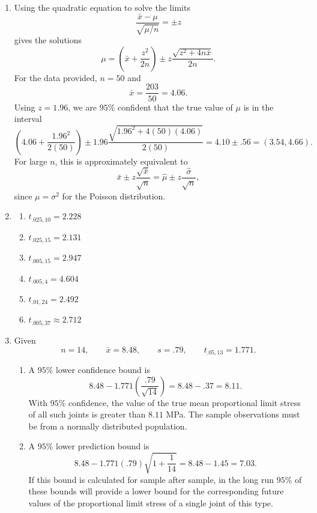 \documentclass[12pt]{article}
\begin{document}
\begin{enumerate}[label=\textbf{\arabic*.}, leftmargin=*]
\begin{enumerate}[label=\alph*.]
    \item
    \[
    n=\left[\frac{2z_{\alpha/2}\sqrt{\hat{p}\hat{q}}}{w}\right]^2
    =\left[\frac{2(2.58)(.5)(.5)}{.05}\right]^2=665.64,
    \]
    so $n$ must be at least $666$.
\end{enumerate}

\setcounter{enumi}{25}
\item
Using the quadratic equation to solve the limits
\[
\frac{\bar{x}-\mu}{\sqrt{\mu/n}}=\pm z
\]
gives the solutions
\[
\mu=\left(\bar{x}+\frac{z^2}{2n}\right)\pm z\frac{\sqrt{z^2+4n\bar{x}}}{2n}.
\]
For the data provided, $n=50$ and
\[
\bar{x}=\frac{203}{50}=4.06.
\]
Using $z=1.96$, we are $95\%$ confident that the true value of $\mu$ is in the interval
\[
\left(4.06+\frac{1.96^2}{2(50)}\right)
\pm1.96\frac{\sqrt{1.96^2+4(50)(4.06)}}{2(50)}
=4.10\pm.56=(3.54,4.66).
\]
For large $n$, this is approximately equivalent to
\[
\bar{x}\pm z\frac{\sqrt{\bar{x}}}{\sqrt{n}}=\hat{\mu}\pm z\frac{\hat{\sigma}}{\sqrt{n}},
\]
since $\mu=\sigma^2$ for the Poisson distribution.

\setcounter{enumi}{29}
\item
\begin{enumerate}[label=\alph*.]
    \item $t_{.025,10}=2.228$
    \item $t_{.025,15}=2.131$
    \item $t_{.005,15}=2.947$
    \item $t_{.005,4}=4.604$
    \item $t_{.01,24}=2.492$
    \item $t_{.005,37}\approx2.712$
\end{enumerate}

\setcounter{enumi}{33}
\item
Given
\[
n=14,\qquad \bar{x}=8.48,\qquad s=.79,\qquad t_{.05,13}=1.771.
\]
\begin{enumerate}[label=\alph*.]
    \item A $95\%$ lower confidence bound is
    \[
    8.48-1.771\left(\frac{.79}{\sqrt{14}}\right)=8.48-.37=8.11.
    \]
    With $95\%$ confidence, the value of the true mean proportional limit stress of all such joints is greater than $8.11$ MPa. The sample observations must be from a normally distributed population.

    \item A $95\%$ lower prediction bound is
    \[
    8.48-1.771(.79)\sqrt{1+\frac{1}{14}}=8.48-1.45=7.03.
    \]
    If this bound is calculated for sample after sample, in the long run $95\%$ of these bounds will provide a lower bound for the corresponding future values of the proportional limit stress of a single joint of this type.
\end{enumerate}


\end{enumerate}
\end{document}
